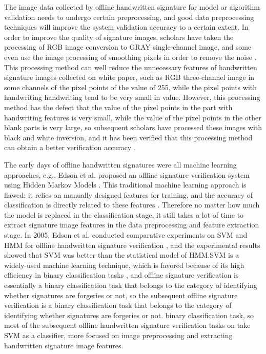 \documentclass{article}
\begin{document}
The image data collected by offline handwritten signature for model or algorithm validation needs to undergo certain preprocessing, and good data preprocessing techniques will improve the system validation accuracy to a certain extent. In order to improve the quality of signature images, scholars have taken the processing of RGB image conversion to GRAY single-channel image, and some even use the image processing of smoothing pixels in order to remove the noise \cite{4}. This processing method can well reduce the unnecessary features of handwritten signature images collected on white paper, such as RGB three-channel image in some channels of the pixel points of the value of 255, while the pixel points with handwriting handwriting tend to be very small in value. However, this processing method has the defect that the value of the pixel points in the part with handwriting features is very small, while the value of the pixel points in the other blank parts is very large, so subsequent scholars have processed these images with black and white inversion, and it has been verified that this processing method can obtain a better verification accuracy \cite{4}.

The early days of offline handwritten signatures were all machine learning approaches, e.g., Edson et al. proposed an offline signature verification system using Hidden Markov Models \cite{5}. This traditional machine learning approach is flawed: it relies on manually designed features for training, and the accuracy of classification is directly related to these features \cite{2}. Therefore no matter how much the model is replaced in the classification stage, it still takes a lot of time to extract signature image features in the data preprocessing and feature extraction stage. In 2005, Edson et al. conducted comparative experiments on SVM and HMM for offline handwritten signature verification \cite{6}, and the experimental results showed that SVM was better than the statistical model of HMM.SVM is a widely-used machine learning technique, which is favored because of its high efficiency in binary classification tasks \cite{7}, and offline signature verification is essentially a binary classification task that belongs to the category of identifying whether signatures are forgeries or not, so the subsequent offline signature verification is a binary classification task that belongs to the category of identifying whether signatures are forgeries or not. binary classification task, so most of the subsequent offline handwritten signature verification tasks on take SVM as a classifier, more focused on image preprocessing and extracting handwritten signature image features.
\end{document}
